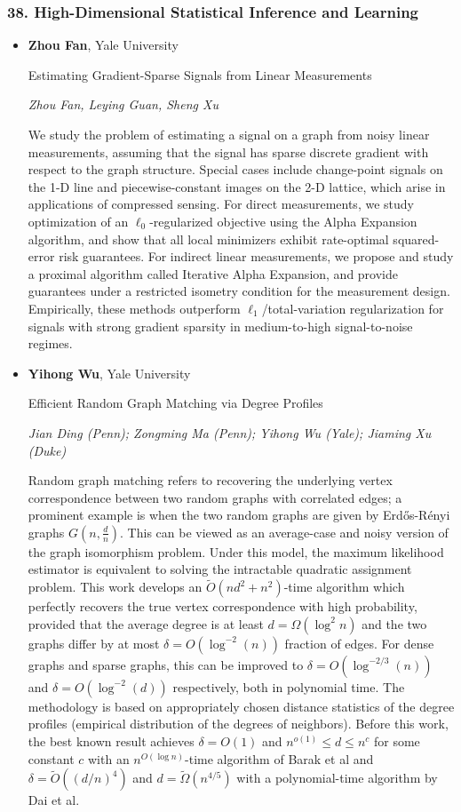 \subsubsection*{38. High-Dimensional Statistical Inference and Learning}

\begin{itemize}
\item \textbf{Zhou Fan}, Yale University

Estimating Gradient-Sparse Signals from Linear Measurements

\emph{\footnotesize Zhou Fan, Leying Guan, Sheng Xu}

We study the problem of estimating a signal on a graph from noisy linear measurements, assuming that the signal has sparse discrete gradient with respect to the graph structure. Special cases include change-point signals on the 1-D line and piecewise-constant images on the 2-D lattice, which arise in applications of compressed sensing. For direct measurements, we study optimization of an $\ell_0$-regularized objective using the Alpha Expansion algorithm, and show that all local minimizers exhibit rate-optimal squared-error risk guarantees. For indirect linear measurements, we propose and study a proximal algorithm called Iterative Alpha Expansion, and provide guarantees under a restricted isometry condition for the measurement design. Empirically, these methods outperform $\ell_1$/total-variation regularization for signals with strong gradient sparsity in medium-to-high signal-to-noise regimes.

\item \textbf{Yihong Wu}, Yale University

Efficient Random Graph Matching via Degree Profiles

\emph{\footnotesize Jian Ding (Penn); Zongming Ma (Penn); Yihong Wu (Yale); Jiaming Xu (Duke)}

Random graph matching refers to recovering the underlying vertex correspondence between two random graphs with correlated edges; a prominent example is when the two random graphs are given by Erd\H{o}s-R\'{e}nyi graphs $G(n,\frac{d}{n})$. This can be viewed as an average-case and noisy version of the graph isomorphism problem. Under this model, the maximum likelihood estimator is equivalent to solving the intractable quadratic assignment problem. This work develops an $\tilde{O}(n d^2+n^2)$-time algorithm which perfectly recovers the true vertex correspondence with high probability, provided that the average degree is at least $d = \Omega(\log^2 n)$ and the two graphs differ by at most $\delta = O( \log^{-2}(n) )$ fraction of edges. For dense graphs and sparse graphs, this can be improved  to $\delta = O( \log^{-2/3}(n) )$ and $\delta = O( \log^{-2}(d) )$ respectively, both in polynomial time. The methodology is based on appropriately chosen distance statistics of the degree profiles (empirical distribution of the degrees of neighbors). Before this work, the best known result achieves $\delta=O(1)$ and $n^{o(1)} \leq d \leq n^c$ for some constant $c$ with an $n^{O(\log n)}$-time algorithm of Barak et al and $\delta=\tilde O((d/n)^4)$ and $d = \tilde{\Omega}(n^{4/5})$ with a polynomial-time algorithm by Dai et al.


\end{itemize}
